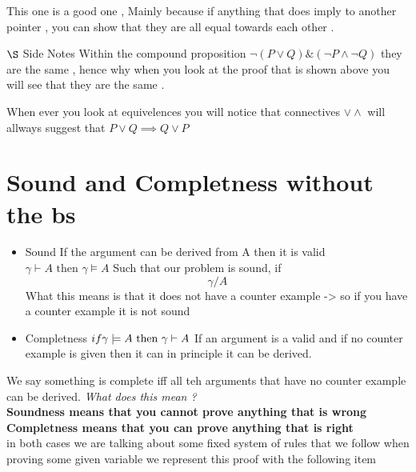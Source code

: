 \documentclass{article}
\theoremstyle{mytheoremstyle}
\theoremstyle{mytheoremstyle}
\theoremstyle{myproblemstyle}
\begin{document}
This one is a good one , Mainly because if anything that does imply to another pointer , you can show that they are all equal towards each other .



\item $\S$ Side Notes
    Within the compound proposition $\neg(P \lor Q) \&  (\neg P \land \neg Q) $ they are the same , hence why when you look at the proof that is shown above you will see that they are the same .

When ever you look at equivelences you will notice that connectives $ \lor \land $ will allways suggest that $ P \lor Q \implies Q \lor P $

\newpage

\section{Sound and Completness without the bs}

\begin{itemize}
    \item Sound
        If the argument can be derived from A then it is valid
        \begin{math}
            \gamma \vdash A \text{ then } \gamma \models A
        \end{math}
        Such that our problem is sound, if \[
            \gamma / A
        \]
        What this means is that it does not have a counter example -> so if you have a counter example it is not sound
    \item Completness
        \begin{math}
            if \\ \gamma \models A \text{ then } \gamma \vdash A
        \end{math}
        If an argument is a valid and if no counter example is given then it can in principle it can be derived.
\end{itemize}

We say something is complete iff all teh arguments that have no counter example can be derived.
\textit{What does this mean ? }\\
\textbf{Soundness means that you cannot prove anything that is wrong} \\
\textbf{Completness means that you can prove anything that is right} \\

in both cases we are talking about some fixed system of rules that we follow when proving some given variable
we represent this proof with the following item
\end{document}
